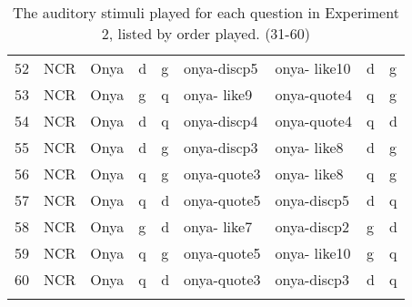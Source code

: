 \begin{table}[t]
\begin{center}
{\begin{tabular}{lllllllll}
52	& NCR	& Onya	& d	& g	& onya-discp5	& onya- like10	& d	& g \\
53	& NCR	& Onya	& g	& q	& onya- like9	& onya-quote4	& q	& g \\
54	& NCR	& Onya	& d	& q	& onya-discp4	& onya-quote4	& q	& d \\
55	& NCR	& Onya	& d	& g	& onya-discp3	& onya- like8	& d	& g \\
56	& NCR	& Onya	& q	& g	& onya-quote3	& onya- like8	& q	& g \\
57	& NCR	& Onya	& q	& d	& onya-quote5 &	onya-discp5	& d	& q \\
58	& NCR	& Onya	& g	& d	& onya- like7	& onya-discp2	& g	& d \\
59	& NCR	& Onya	& q	& g	& onya-quote5	& onya- like10	& g	& q \\
60	& NCR	& Onya	& q	& d	& onya-quote3	& onya-discp3	& d	& q \\
   \lspbottomrule
        &      &     	&   	&   	& \hspaceThis{meredith-like2discp}& {meredith-like2discp}&           \\

   
	\end{tabular}
}
	\caption{The auditory stimuli played for each question in Experiment 2, listed by order played.  (31-60)}\label{tab:appenExp2stimuli3160}
	\end{center}
\end{table}	



\clearpage



